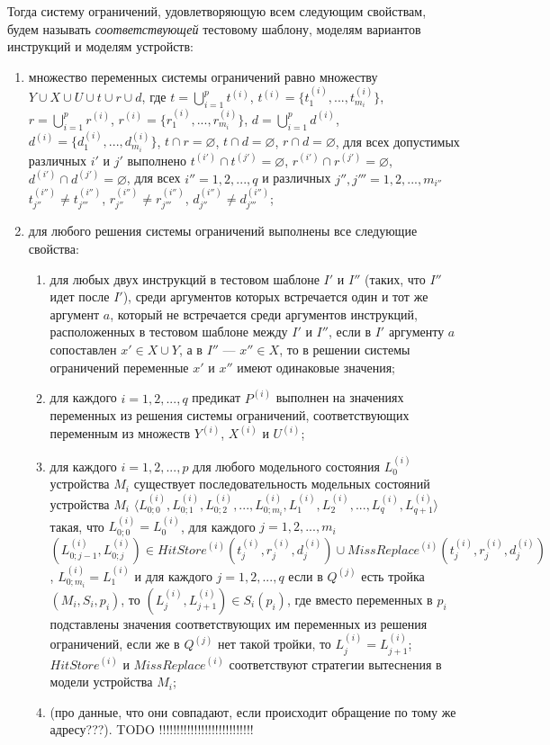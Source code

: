 Тогда систему ограничений, удовлетворяющую всем следующим свойствам, будем называть \emph{соответствующей} тестовому шаблону, моделям вариантов инструкций и моделям устройств:
  \begin{enumerate}
    \item множество переменных системы ограничений равно множеству $Y \cup X \cup U \cup t \cup r \cup d$, где $t = \bigcup_{i=1}^p t^{(i)}$, $t^{(i)} = \{t_1^{(i)}, ..., t_{m_i}^{(i)}\}$, $r = \bigcup_{i=1}^p r^{(i)}$, $r^{(i)} = \{r_1^{(i)}, ..., r_{m_i}^{(i)}\}$, $d = \bigcup_{i=1}^p d^{(i)}$, $d^{(i)} = \{d_1^{(i)}, ..., d_{m_i}^{(i)}\}$, $t \cap r = \varnothing$, $t \cap d = \varnothing$, $r \cap d = \varnothing$, для всех допустимых различных $i'$ и $j'$ выполнено $t^{(i')} \cap t^{(j')} = \varnothing$, $r^{(i')} \cap r^{(j')} = \varnothing$, $d^{(i')} \cap d^{(j')} = \varnothing$, для всех $i'' = 1, 2, ..., q$ и различных $j'', j''' = 1, 2, ..., m_{i''}$ $t_{j''}^{(i'')} \neq t_{j'''}^{(i'')}$, $r_{j''}^{(i'')} \neq r_{j'''}^{(i'')}$, $d_{j''}^{(i'')} \neq d_{j'''}^{(i'')}$;

    \item для любого решения системы ограничений выполнены все следующие свойства:
        \begin{enumerate}
          \item для любых двух инструкций в тестовом шаблоне $I'$ и $I''$ (таких, что $I''$ идет после $I'$), среди аргументов которых встречается один и тот же аргумент $a$, который не встречается среди аргументов инструкций, расположенных в тестовом шаблоне между $I'$ и $I''$, если в $I'$ аргументу $a$ сопоставлен $x' \in X \cup Y$, а в $I''$ --- $x'' \in X$, то в решении системы ограничений переменные $x'$ и $x''$ имеют одинаковые значения;
          \item для каждого $i = 1, 2, ..., q$ предикат $P^{(i)}$ выполнен на значениях переменных из решения системы ограничений, соответствующих переменным из множеств $Y^{(i)}$, $X^{(i)}$ и $U^{(i)}$;
          \item для каждого $i = 1, 2, ..., p$ для любого модельного состояния $L_0^{(i)}$ устройства $M_i$ существует последовательность модельных состояний устройства $M_i$ $\langle L_{0;0}^{(i)}, L_{0;1}^{(i)}, L_{0;2}^{(i)}, ..., L_{0;m_i}^{(i)}, L_1^{(i)}, L_2^{(i)}, ..., L_q^{(i)}, L_{q+1}^{(i)} \rangle$ такая, что $L_{0;0}^{(i)} = L_0^{(i)}$, для каждого $j = 1, 2, ..., m_i$ $(L_{0;j-1}^{(i)}, L_{0;j}^{(i)}) \in HitStore^{(i)} (t_j^{(i)}, r_j^{(i)}, d_j^{(i)}) \cup MissReplace^{(i)} (t_j^{(i)}, r_j^{(i)}, d_j^{(i)})$, $L_{0;m_i}^{(i)} = L_1^{(i)}$ и для каждого $j = 1, 2, ..., q$ если в $Q^{(j)}$ есть тройка $(M_i, S_i, p_i)$, то $(L_j^{(i)}, L_{j+1}^{(i)}) \in S_i(p_i)$, где вместо переменных в $p_i$ подставлены значения соответствующих им переменных из решения ограничений, если же в $Q^{(j)}$ нет такой тройки, то $L_j^{(i)} = L_{j+1}^{(i)}$; $HitStore^{(i)}$ и $MissReplace^{(i)}$ соответствуют стратегии вытеснения в модели устройства $M_i$;
          \item (про данные, что они совпадают, если происходит обращение по тому же адресу???).   TODO !!!!!!!!!!!!!!!!!!!!!!!!!!!
        \end{enumerate}
  \end{enumerate}

